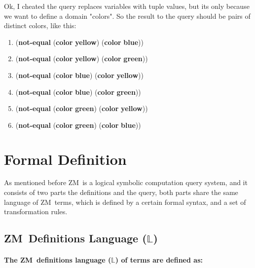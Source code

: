 \documentclass[11pt,a4paper]{report}
\newcommand{\zm}{ZM}
\newcommand{\zconst}[1]{\textbf{#1}}
\newcommand{\ztuple}[1]{(#1)}
\newcommand{\zexample}[1]{\begin{center} #1 \end{center}}
\begin{document}
    Ok, I cheated the query replaces variables with tuple values, but its only because we want to define a domain "colors". 
    So the result to the query should be pairs of distinct colors, like this:
    
    \zexample{
        \begin{enumerate}
            \item \ztuple{\zconst{not-equal} \ztuple{\zconst{color} \zconst{yellow}} \ztuple{\zconst{color} \zconst{blue}}}
            \item \ztuple{\zconst{not-equal} \ztuple{\zconst{color} \zconst{yellow}} \ztuple{\zconst{color} \zconst{green}}}
            \item \ztuple{\zconst{not-equal} \ztuple{\zconst{color} \zconst{blue}} \ztuple{\zconst{color} \zconst{yellow}}}
            \item \ztuple{\zconst{not-equal} \ztuple{\zconst{color} \zconst{blue}} \ztuple{\zconst{color} \zconst{green}}}
            \item \ztuple{\zconst{not-equal} \ztuple{\zconst{color} \zconst{green}} \ztuple{\zconst{color} \zconst{yellow}}}
            \item \ztuple{\zconst{not-equal} \ztuple{\zconst{color} \zconst{green}} \ztuple{\zconst{color} \zconst{blue}}}
        \end{enumerate}
    }

\section{Formal Definition}

As mentioned before \zm\ is a logical symbolic computation query system, and it consists of two parts
the definitions and the query, both parts share the same language of \zm\ terms, which is defined by
a certain formal syntax, and a set of transformation rules.

\subsection{\zm\ Definitions Language ($\mathbb{L}$)}
\paragraph{The \zm\ definitions language ($\mathbb{L}$) of terms are defined as:}
\end{document}
